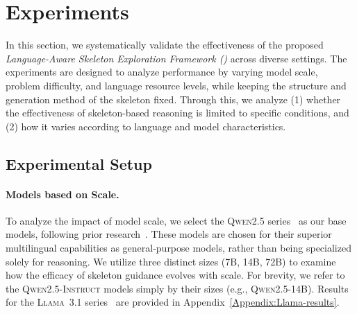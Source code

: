 \section{Experiments}

In this section, we systematically validate the effectiveness of the proposed \emph{Language-Aware Skeleton Exploration Framework (\Lasef)} across diverse settings. The experiments are designed to analyze performance by varying model scale, problem difficulty, and language resource levels, while keeping the structure and generation method of the skeleton fixed. Through this, we analyze (1) whether the effectiveness of skeleton-based reasoning is limited to specific conditions, and (2) how it varies according to language and model characteristics.

\subsection{Experimental Setup}

\paragraph{Models based on Scale.} 
To analyze the impact of model scale, we select the \textsc{Qwen2.5} series~\citep{qwen2025qwen25technicalreport} as our base models, following prior research~\citep{qi2025sot}. These models are chosen for their superior multilingual capabilities as general-purpose models, rather than being specialized solely for reasoning. We utilize three distinct sizes (7B, 14B, 72B) to examine how the efficacy of skeleton guidance evolves with scale. For brevity, we refer to the \textsc{Qwen2.5-Instruct} models simply by their sizes (e.g., \textsc{Qwen2.5-14B}). Results for the \textsc{Llama~3.1} series~\citep{grattafiori2024llama3herdmodels} are provided in Appendix~\ref{Appendix:Llama-results}.

